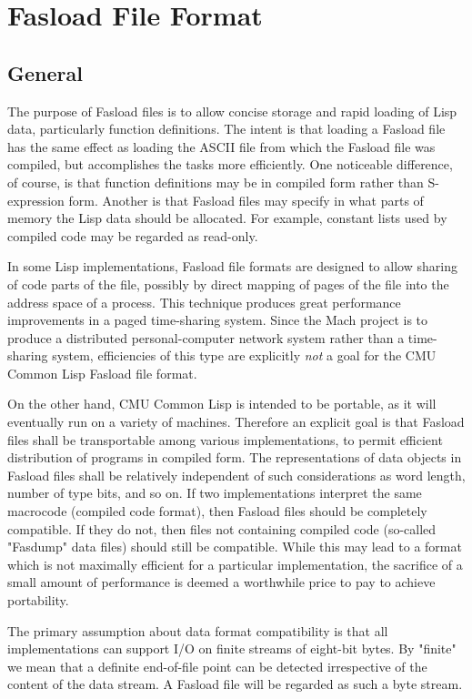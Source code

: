 \chapter{Fasload File Format}%
\section{General}

The purpose of Fasload files is to allow concise storage and rapid
loading of Lisp data, particularly function definitions.  The intent
is that loading a Fasload file has the same effect as loading the
ASCII file from which the Fasload file was compiled, but accomplishes
the tasks more efficiently.  One noticeable difference, of course, is
that function definitions may be in compiled form rather than
S-expression form.  Another is that Fasload files may specify in what
parts of memory the Lisp data should be allocated.  For example,
constant lists used by compiled code may be regarded as read-only.

In some Lisp implementations, Fasload file formats are designed to
allow sharing of code parts of the file, possibly by direct mapping
of pages of the file into the address space of a process.  This
technique produces great performance improvements in a paged
time-sharing system.  Since the Mach project is to produce a
distributed personal-computer network system rather than a
time-sharing system, efficiencies of this type are explicitly {\it not}
a goal for the CMU Common Lisp Fasload file format.

On the other hand, CMU Common Lisp is intended to be portable, as it will
eventually run on a variety of machines.  Therefore an explicit goal
is that Fasload files shall be transportable among various
implementations, to permit efficient distribution of programs in
compiled form.  The representations of data objects in Fasload files
shall be relatively independent of such considerations as word
length, number of type bits, and so on.  If two implementations
interpret the same macrocode (compiled code format), then Fasload
files should be completely compatible.  If they do not, then files
not containing compiled code (so-called "Fasdump" data files) should
still be compatible.  While this may lead to a format which is not
maximally efficient for a particular implementation, the sacrifice of
a small amount of performance is deemed a worthwhile price to pay to
achieve portability.

The primary assumption about data format compatibility is that all
implementations can support I/O on finite streams of eight-bit bytes.
By "finite" we mean that a definite end-of-file point can be detected
irrespective of the content of the data stream.  A Fasload file will
be regarded as such a byte stream.

